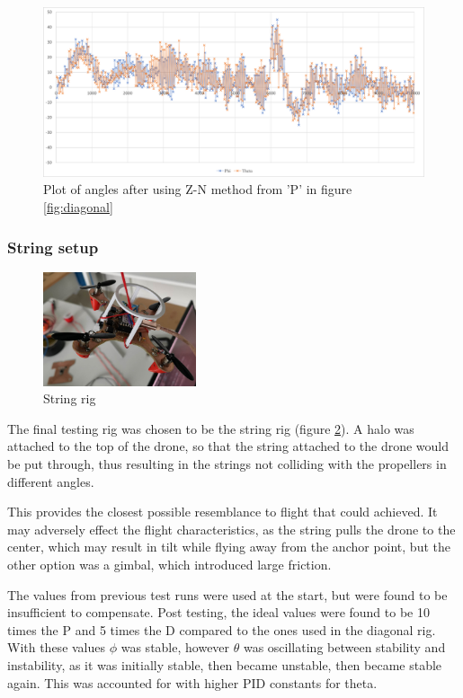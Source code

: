 \begin{figure}[h!]
    \centering
    \includegraphics[width=\textwidth]{pictures/graphs/ZN.png}
    \caption{Plot of angles after using Z-N method from 'P' in figure \ref{fig:diagonal}}
    \label{fig:ZN}
\end{figure}

\newpage
\subsubsection{String setup}
\begin{figure}
    \centering
    \includegraphics[width=0.4\textwidth]{pictures/String_rig.jpg}
    \caption{String rig}
    \label{fig:string_rig}
\end{figure}
The final testing rig was chosen to be the string rig (figure \ref{fig:string_rig}). A halo was attached to the top of the drone, so that the string attached to the drone would be put through, thus resulting in the strings not colliding with the propellers in different angles.

This provides the closest possible resemblance to flight that could achieved. It may adversely effect the flight characteristics, as the string pulls the drone to the center, which may result in tilt while flying away from the anchor point, but the other option was a gimbal, which introduced large friction.

The values from previous test runs were used at the start, but were found to be insufficient to compensate. Post testing, the ideal values were found to be 10 times the P and 5 times the D compared to the ones used in the diagonal rig. With these values $\phi$ was stable, however $\theta$ was oscillating between stability and instability, as it was initially stable, then became unstable, then became stable again. This was accounted for with higher PID constants for theta.

